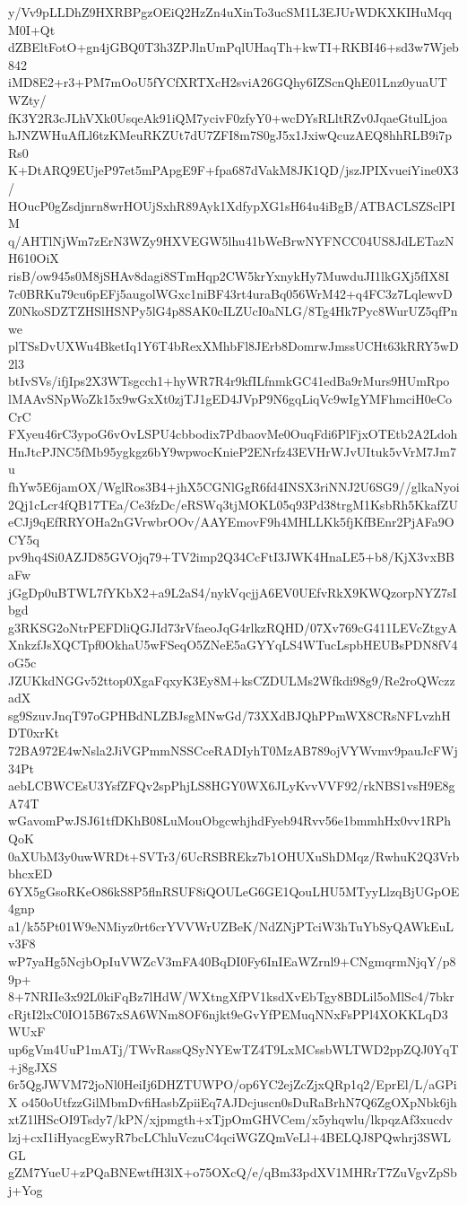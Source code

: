 y/Vv9pLLDhZ9HXRBPgzOEiQ2HzZn4uXinTo3ucSM1L3EJUrWDKXKIHuMqqM0I+Qt
dZBEltFotO+gn4jGBQ0T3h3ZPJlnUmPqlUHaqTh+kwTI+RKBI46+sd3w7Wjeb842
iMD8E2+r3+PM7mOoU5fYCfXRTXcH2sviA26GQhy6IZScnQhE01Lnz0yuaUTWZty/
fK3Y2R3cJLhVXk0UsqeAk91iQM7ycivF0zfyY0+wcDYsRLltRZv0JqaeGtulLjoa
hJNZWHuAfLl6tzKMeuRKZUt7dU7ZFI8m7S0gJ5x1JxiwQcuzAEQ8hhRLB9i7pRs0
K+DtARQ9EUjeP97et5mPApgE9F+fpa687dVakM8JK1QD/jszJPIXvueiYine0X3/
HOucP0gZsdjnrn8wrHOUjSxhR89Ayk1XdfypXG1sH64u4iBgB/ATBACLSZSclPIM
q/AHTlNjWm7zErN3WZy9HXVEGW5lhu41bWeBrwNYFNCC04US8JdLETazNH610OiX
risB/ow945s0M8jSHAv8dagi8STmHqp2CW5krYxnykHy7MuwduJI1lkGXj5fIX8I
7c0BRKu79cu6pEFj5augolWGxc1niBF43rt4uraBq056WrM42+q4FC3z7LqlewvD
Z0NkoSDZTZHSlHSNPy5lG4p8SAK0cILZUcI0aNLG/8Tg4Hk7Pyc8WurUZ5qfPnwe
plTSsDvUXWu4BketIq1Y6T4bRexXMhbFl8JErb8DomrwJmssUCHt63kRRY5wD2l3
btIvSVs/ifjIps2X3WTsgcch1+hyWR7R4r9kfILfnmkGC41edBa9rMurs9HUmRpo
lMAAvSNpWoZk15x9wGxXt0zjTJ1gED4JVpP9N6gqLiqVc9wIgYMFhmciH0eCoCrC
FXyeu46rC3ypoG6vOvLSPU4cbbodix7PdbaovMe0OuqFdi6PlFjxOTEtb2A2Ldoh
HnJtcPJNC5fMb95ygkgz6bY9wpwocKnieP2ENrfz43EVHrWJvUItuk5vVrM7Jm7u
fhYw5E6jamOX/WglRos3B4+jhX5CGNlGgR6fd4INSX3riNNJ2U6SG9//glkaNyoi
2Qj1cLcr4fQB17TEa/Ce3fzDc/eRSWq3tjMOKL05q93Pd38trgM1KsbRh5KkafZU
eCJj9qEfRRYOHa2nGVrwbrOOv/AAYEmovF9h4MHLLKk5fjKfBEnr2PjAFa9OCY5q
pv9hq4Si0AZJD85GVOjq79+TV2imp2Q34CcFtI3JWK4HnaLE5+b8/KjX3vxBBaFw
jGgDp0uBTWL7fYKbX2+a9L2aS4/nykVqcjjA6EV0UEfvRkX9KWQzorpNYZ7sIbgd
g3RKSG2oNtrPEFDliQGJId73rVfaeoJqG4rlkzRQHD/07Xv769cG411LEVcZtgyA
XnkzfJsXQCTpf0OkhaU5wFSeqO5ZNeE5aGYYqLS4WTucLspbHEUBsPDN8fV4oG5c
JZUKkdNGGv52ttop0XgaFqxyK3Ey8M+ksCZDULMs2Wfkdi98g9/Re2roQWczzadX
sg9SzuvJnqT97oGPHBdNLZBJsgMNwGd/73XXdBJQhPPmWX8CRsNFLvzhHDT0xrKt
72BA972E4wNsla2JiVGPmmNSSCceRADIyhT0MzAB789ojVYWvmv9pauJcFWj34Pt
aebLCBWCEsU3YsfZFQv2spPhjLS8HGY0WX6JLyKvvVVF92/rkNBS1vsH9E8gA74T
wGavomPwJSJ61tfDKhB08LuMouObgcwhjhdFyeb94Rvv56e1bmmhHx0vv1RPhQoK
0aXUbM3y0uwWRDt+SVTr3/6UcRSBREkz7b1OHUXuShDMqz/RwhuK2Q3VrbbhcxED
6YX5gGsoRKeO86kS8P5flnRSUF8iQOULeG6GE1QouLHU5MTyyLlzqBjUGpOE4gnp
a1/k55Pt01W9eNMiyz0rt6crYVVWrUZBeK/NdZNjPTciW3hTuYbSyQAWkEuLv3F8
wP7yaHg5NcjbOpIuVWZcV3mFA40BqDI0Fy6InIEaWZrnl9+CNgmqrmNjqY/p89p+
8+7NRIIe3x92L0kiFqBz7lHdW/WXtngXfPV1ksdXvEbTgy8BDLil5oMlSc4/7bkr
cRjtI2lxC0IO15B67xSA6WNm8OF6njkt9eGvYfPEMuqNNxFsPPl4XOKKLqD3WUxF
up6gVm4UuP1mATj/TWvRassQSyNYEwTZ4T9LxMCssbWLTWD2ppZQJ0YqT+j8gJXS
6r5QgJWVM72joNl0HeiIj6DHZTUWPO/op6YC2ejZcZjxQRp1q2/EprEl/L/aGPiX
o450oUtfzzGilMbmDvfiHasbZpiiEq7AJDcjuscn0sDuRaBrhN7Q6ZgOXpNbk6jh
xtZ1lHScOI9Tsdy7/kPN/xjpmgth+xTjpOmGHVCem/x5yhqwlu/lkpqzAf3xucdv
lzj+cxI1iHyacgEwyR7bcLChluVczuC4qciWGZQmVeLl+4BELQJ8PQwhrj3SWLGL
gZM7YueU+zPQaBNEwtfH3lX+o75OXcQ/e/qBm33pdXV1MHRrT7ZuVgvZpSbj+Yog
